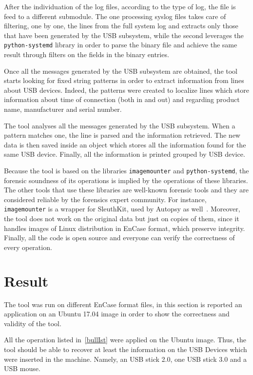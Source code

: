 \documentclass[a4paper]{article}
\begin{document}
After the individuation of the log files, according to the type of log, the
file is feed to a different submodule. The one processing syslog files takes
care of filtering, one by one, the lines from the full system log and extracts
only those that have been generated by the USB subsystem, while the second
leverages the \texttt{python-systemd} library in order to parse the binary file
and achieve the same result through filters on the fields in the binary
entries.

Once all the messages generated by the USB subsystem are obtained, the tool
starts looking for fixed string patterns in order to extract information from
lines about USB devices. Indeed, the patterns were created to localize lines
which store information about time of connection (both in and out) and
regarding product name, manufacturer and serial number.

The tool analyses all the messages generated by the USB subsystem. When a
pattern matches one, the line is parsed and the information retrieved. The new
data is then saved inside an object which stores all the information found for
the same USB device. Finally, all the information is printed grouped by USB
device.

Because the tool is based on the libraries \texttt{imagemounter} and
\texttt{python-systemd}, the forensic soundness of its operations is implied by
the operations of these libraries. The other tools that use these libraries are
well-known forensic tools and they are considered reliable by the forensics
expert community. For instance, \texttt{imagemounter} is a wrapper for
SleuthKit, used by Autopsy as well~\cite{sleuthkit}. Moreover, the tool does not
work on the original data but just on copies of them, since it handles images of
Linux distribution in EnCase format, which preserve integrity. Finally, all the
code is open source and everyone can verify the correctness of every operation.

\section{Result}
\label{sec:result}

The tool was run on different EnCase format files, in this section is
reported an application on an Ubuntu 17.04 image in order to show the
correctness and validity of the tool.

All the operation listed in~\ref{bullIst} were applied on the Ubuntu image. Thus,
the tool should be able to recover at least the information on the USB Devices
which were  inserted in the machine. Namely, an USB stick 2.0, one USB stick 3.0
and a USB mouse.
\end{document}
